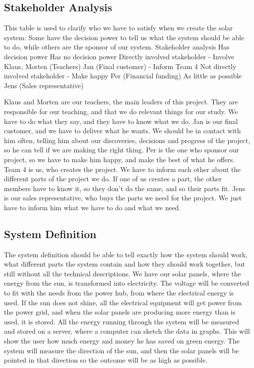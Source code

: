 \documentclass[12pt,a4paper]{report}
\begin{document}
\subsection{Stakeholder Analysis}
This table is used to clarify who we have to satisfy when we create the solar system. Some have the decision power to tell us what the system should be able to do, while others are the sponsor of our system.
Stakeholder analysis	Has decision power	Has no decision power
Directly involved stakeholder - Involve
Klaus, Morten (Teachers)
Jan (Final customer) - Inform
Team 4
Not directly involved stakeholder - Make happy
Per (Financial funding) As little as possible
Jens (Sales representative)

Klaus and Morten are our teachers, the main leaders of this project. They are responsible for our teaching, and that we do relevant things for our study. We have to do what they say, and they have to know what we do.
Jan is our final customer, and we have to deliver what he wants. We should be in contact with him often, telling him about our discoveries, decisions and progress of the project, so he can tell if we are making the right thing.
Per is the one who sponsor our project, so we have to make him happy, and make the best of what he offers.
Team 4 is us, who creates the project. We have to inform each other about the different parts of the project we do. If one of us creates a part, the other members have to know it, so they don’t do the same, and so their parts fit.
Jens is our sales representative, who buys the parts we need for the project. We just have to inform him what we have to do and what we need.

\subsection{System Definition}
The system definition should be able to tell exactly how the system should work, what different parts the system contain and how they should work together, but still without all the technical descriptions.
We have our solar panels, where the energy from the sun, is transformed into electricity. The voltage will be converted to fit with the needs from the power hub, from where the electrical energy is used. If the sun does not shine, all the electrical equipment will get power from the power grid, and when the solar panels are producing more energy than is used, it is stored.
All the energy running through the system will be measured and stored on a server, where a computer can sketch the data in graphs. This will show the user how much energy and money he has saved on green energy.
The system will measure the direction of the sun, and then the solar panels will be pointed in that direction so the outcome will be as high as possible.
\end{document}

